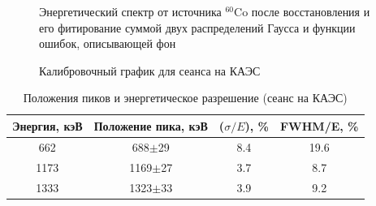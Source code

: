 \begin{figure}[H]
  \caption{Энергетический спектр от источника $^{60}$Co после восстановления и его фитирование суммой двух распределений Гаусса и функции ошибок, описывающей фон}
  \label{img:spectrCo2022}  
\end{figure}

\begin{figure}[H]
  \caption{Калибровочный график для сеанса на КАЭС}
  \label{img:calibr2022}  
\end{figure}

\begin{table}[hbt]
    \centering
        \caption{Положения пиков и энергетическое разрешение (сеанс на КАЭС)}
\begin{tabular}{|c|c|c|c|}
\hline
    Энергия, кэВ & Положение пика, кэВ & ($\sigma/E$), \% & FWHM/E,  \%\\
    \hline
    662 & 688$\pm$29 & 8.4 & 19.6\\
    \hline
    1173 & 1169$\pm$27 & 3.7 & 8.7\\
    \hline
    1333 & 1323$\pm$33 & 3.9 & 9.2\\
    \hline
\end{tabular}    
\label{tab:resolution2022}
\end{table}


